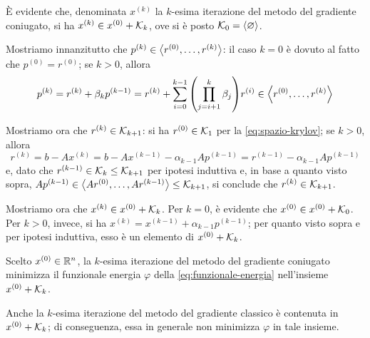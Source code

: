 	\begin{osservazione}
		È evidente che, denominata \(x^{(k)}\) la \(k\)-esima iterazione del metodo del gradiente coniugato, si ha \(x^{(k)} \in x^{(0)} + \mathcal{K}_k\), ove si è posto \(\mathcal{K}_0 = \Braket{\varnothing}\).
		
		Mostriamo innanzitutto che \(p^{(k)} \in \Braket{r^{(0)}, \dots, r^{(k)}}\): il caso \(k = 0\) è dovuto al fatto che \(p^{(0)} = r^{(0)}\); se \(k > 0\), allora
		\begin{equation*}
			p^{(k)} = r^{(k)} + \beta_k p^{(k -1)} = r^{(k)} + \sum_{i = 0}^{k - 1} \qty(\prod_{j = i + 1}^k \beta_j) r^{(i)} \in \Braket{r^{(0)}, \dots, r^{(k)}}
		\end{equation*}
		
		Mostriamo ora che \(r^{(k)} \in \mathcal{K}_{k + 1}\): si ha \(r^{(0)} \in \mathcal{K}_1\) per la \eqref{eq:spazio-krylov}; se \(k > 0\), allora
		\begin{equation*}
			r^{(k)} = b - A x^{(k)} = b - A x^{(k - 1)} - \alpha_{k - 1} A p^{(k - 1)} = r^{(k - 1)} - \alpha_{k - 1} A p^{(k - 1)}
		\end{equation*}
		e, dato che \(r^{(k - 1)} \in \mathcal{K}_k \le \mathcal{K}_{k + 1}\) per ipotesi induttiva e, in base a quanto visto sopra, \(A p^{(k - 1)} \in \Braket{A r^{(0)}, \dots, A r^{(k - 1)}} \le \mathcal{K}_{k + 1}\), si conclude che \(r^{(k)} \in \mathcal{K}_{k + 1}\).
		
		Mostriamo ora che \(x^{(k)} \in x^{(0)} + \mathcal{K}_k\). Per \(k = 0\), è evidente che \(x^{(0)} \in x^{(0)} + \mathcal{K}_0\). Per \(k > 0\), invece, si ha \(x^{(k)} = x^{(k - 1)} + \alpha_{k - 1} p^{(k - 1)}\); per quanto visto sopra e per ipotesi induttiva, esso è un elemento di \(x^{(0)} + \mathcal{K}_k\).
	\end{osservazione}

	\begin{teorema}\label{th:minimo-funz-energia-krylov}
		Scelto \(x^{(0)} \in \mathbb{R}^n\), la \(k\)-esima iterazione del metodo del gradiente coniugato minimizza il funzionale energia \(\varphi\) della \eqref{eq:funzionale-energia} nell'insieme \(x^{(0)} + \mathcal{K}_k\).
	\end{teorema}

	\begin{osservazione}
		Anche la \(k\)-esima iterazione del metodo del gradiente classico è contenuta in \(x^{(0)} + \mathcal{K}_k\); di conseguenza, essa in generale non minimizza \(\varphi\) in tale insieme.
	\end{osservazione}
	
